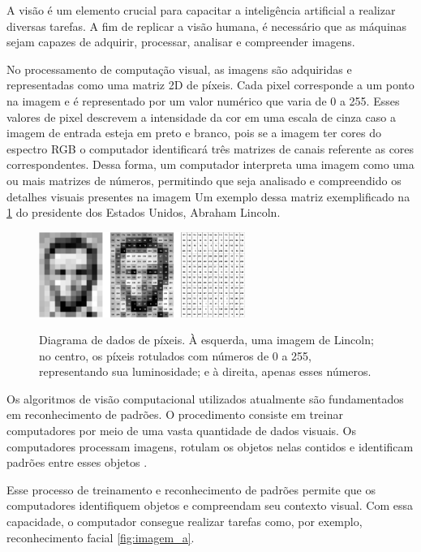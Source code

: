 A visão é um elemento crucial para capacitar a inteligência artificial a realizar diversas tarefas. A fim de replicar a visão humana, é necessário que as máquinas sejam capazes de adquirir, processar, analisar e compreender imagens. \space\cite{como_funciona_visao_computacional}



No processamento de computação visual, as imagens são adquiridas e representadas como uma matriz 2D de píxeis. Cada pixel corresponde a um ponto na imagem e é representado por um valor numérico que varia de 0 a 255. Esses valores de pixel descrevem a intensidade da cor em uma escala de cinza caso a imagem de entrada esteja em preto e branco, pois se a imagem ter cores do espectro RGB o computador identificará três matrizes de canais referente as cores correspondentes. Dessa forma, um computador interpreta uma imagem como uma ou mais matrizes de números, permitindo que seja analisado e compreendido os detalhes visuais presentes na imagem Um exemplo dessa matriz exemplificado na \cref{fig:comp_vision} do presidente dos Estados Unidos, Abraham Lincoln\cite{mit_video}.

\begin{figure}[ht]
	\caption{Diagrama de dados de píxeis. À esquerda, uma imagem de Lincoln; no centro, os píxeis rotulados com números de 0 a 255, representando sua luminosidade; e à direita, apenas esses números.}
	\centering
	\includegraphics[width=0.6\textwidth]{figures/lincoln_pixel_values.png}
  \label{fig:comp_vision}
\end{figure}

Os algoritmos de visão computacional utilizados atualmente são fundamentados em reconhecimento de padrões. O procedimento consiste em treinar computadores por meio de uma vasta quantidade de dados visuais. Os computadores processam imagens, rotulam os objetos nelas contidos e identificam padrões entre esses objetos \space\cite{content_Human_Vision}.

Esse processo de treinamento e reconhecimento de padrões permite que os computadores identifiquem objetos e compreendam seu contexto visual. Com essa capacidade, o computador consegue realizar tarefas como, por exemplo, reconhecimento facial \cref{fig:imagem_a}.



